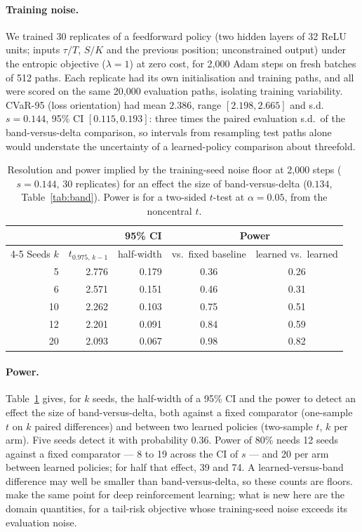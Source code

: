 \documentclass{article}
\newcommand{\cvar}{CVaR-95}
\begin{document}
\paragraph{Training noise.} We trained 30 replicates of a feedforward policy (two hidden layers of
32 ReLU units; inputs $\tau/T$, $S/K$ and the previous position; unconstrained output) under the
entropic objective ($\lambda = 1$) at zero cost, for 2{,}000 Adam steps on fresh batches of 512
paths. Each replicate had its own initialisation and training paths, and all were scored on the
same 20{,}000 evaluation paths, isolating training variability. \cvar{} (loss orientation) had
mean $2.386$, range $[2.198, 2.665]$ and s.d.\ $s = 0.144$, 95\% CI $[0.115, 0.193]$: three times
the paired evaluation s.d.\ of the band-versus-delta comparison, so intervals from resampling test
paths alone would understate the uncertainty of a learned-policy comparison about threefold.

\begin{table}[t]
  \caption{Resolution and power implied by the training-seed noise floor at 2{,}000 steps
    ($s = 0.144$, 30 replicates) for an effect the size of band-versus-delta ($0.134$,
    Table~\ref{tab:band}).
    Power is for a two-sided $t$-test at $\alpha = 0.05$, from the noncentral $t$.}
  \label{tab:power}
  \centering
  \small
  \begin{tabular}{rrrcc}
    \toprule
     & & 95\% CI & \multicolumn{2}{c}{Power} \\
    \cmidrule(lr){4-5}
    Seeds $k$ & $t_{0.975,\,k-1}$ & half-width & vs.\ fixed baseline & learned vs.\ learned \\
    \midrule
    5  & 2.776 & 0.179 & 0.36 & 0.26 \\
    6  & 2.571 & 0.151 & 0.46 & 0.31 \\
    10 & 2.262 & 0.103 & 0.75 & 0.51 \\
    12 & 2.201 & 0.091 & 0.84 & 0.59 \\
    20 & 2.093 & 0.067 & 0.98 & 0.82 \\
    \bottomrule
  \end{tabular}
\end{table}

\paragraph{Power.} Table~\ref{tab:power} gives, for $k$ seeds, the half-width of a 95\% CI and the
power to detect an effect the size of band-versus-delta, both against a fixed comparator
(one-sample $t$ on $k$ paired differences) and between two learned policies (two-sample $t$, $k$
per arm). Five seeds detect it with probability $0.36$. Power of 80\% needs 12 seeds against a
fixed comparator --- 8 to 19 across the CI of $s$ --- and 20 per arm between learned policies; for
half that effect, 39 and 74. A learned-versus-band difference may well be smaller than
band-versus-delta, so these counts are floors. \citet{colas2018seeds} make the same point for deep
reinforcement learning; what is new here are the domain quantities, for a tail-risk objective
whose training-seed noise exceeds its evaluation noise.
\end{document}
